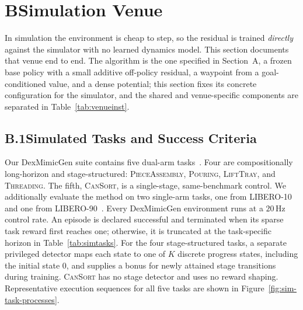 \documentclass[letterpaper]{article} %
\newcounter{algorithm}
\begin{document}
\section{B\quad Simulation Venue}

In simulation the environment is cheap to step, so the residual is trained
\emph{directly} against the simulator with no learned dynamics model. This section
documents that venue end to end. The algorithm is the one specified in Section~A, a frozen base policy with a small
additive off-policy residual, a waypoint from a goal-conditioned value, and a dense
potential; this section fixes its concrete configuration for the simulator, and the
shared and venue-specific components are separated in Table~\ref{tab:venueinst}.

\subsection{B.1\quad Simulated Tasks and Success Criteria}

Our DexMimicGen suite contains five dual-arm
tasks~\cite{jia2024dexmimicgen,mandlekar2023mimicgen}. Four are compositionally
long-horizon and stage-structured: \textsc{PieceAssembly}, \textsc{Pouring},
\textsc{LiftTray}, and \textsc{Threading}. The fifth, \textsc{CanSort}, is a
single-stage, same-benchmark control. We additionally evaluate the method on two
single-arm tasks, one from LIBERO-10 and one from
LIBERO-90~\cite{liu2023libero}. Every DexMimicGen environment runs at a
$20$\,Hz control rate. An episode is declared successful and terminated when its
sparse task reward first reaches one; otherwise, it is truncated at the
task-specific horizon in Table~\ref{tab:simtasks}. For the four stage-structured
tasks, a separate privileged detector maps each state to one of $K$ discrete
progress states, including the initial state $0$, and supplies a bonus for newly
attained stage transitions during training. \textsc{CanSort} has no stage detector
and uses no reward shaping. Representative execution sequences for all five tasks
are shown in Figure~\ref{fig:sim-task-processes}.
\end{document}

